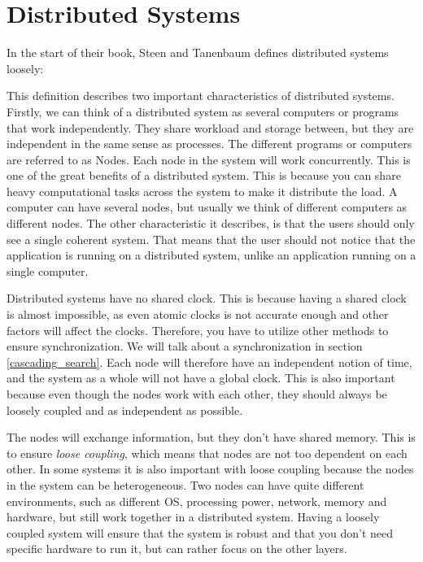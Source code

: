 

\section{Distributed Systems}\label{distributed_systems}
In the start of their book, Steen and Tanenbaum\cite{steen_distributed_2017} defines distributed systems loosely: 

This definition describes two important characteristics of distributed systems. Firstly, we can think of a distributed system as several computers or programs that work independently. They share workload and storage between, but they are independent in the same sense as processes. The different programs or computers are referred to as Nodes. Each node in the system will work concurrently. This is one of the great benefits of a distributed system. This is because you can share heavy computational tasks across the system to make it distribute the load. A computer can have several nodes, but usually we think of different computers as different nodes. The other characteristic it describes, is that the users should only see a single coherent system. That means that the user should not notice that the application is running on a distributed system, unlike an application running on a single computer.

Distributed systems have no shared clock. This is because having a shared clock is almost impossible, as even atomic clocks is not accurate enough and other factors will affect the clocks. Therefore, you have to utilize other methods to ensure synchronization. We will talk about a synchronization in section \ref{cascading_search}. Each node will therefore have an independent notion of time, and the system as a whole will not have a global clock\cite{steen_distributed_2017}. This is also important because even though the nodes work with each other, they should always be loosely coupled and as independent as possible.

The nodes will exchange information, but they don’t have shared memory. This is to ensure \textit{loose coupling}, which means that nodes are not too dependent on each other. In some systems it is also important with loose coupling because the nodes in the system can be heterogeneous. Two nodes can have quite different environments, such as different OS, processing power, network, memory and hardware, but still work together in a distributed system. Having a loosely coupled system will ensure that the system is robust and that you don't need specific hardware to run it, but can rather focus on the other layers. 


